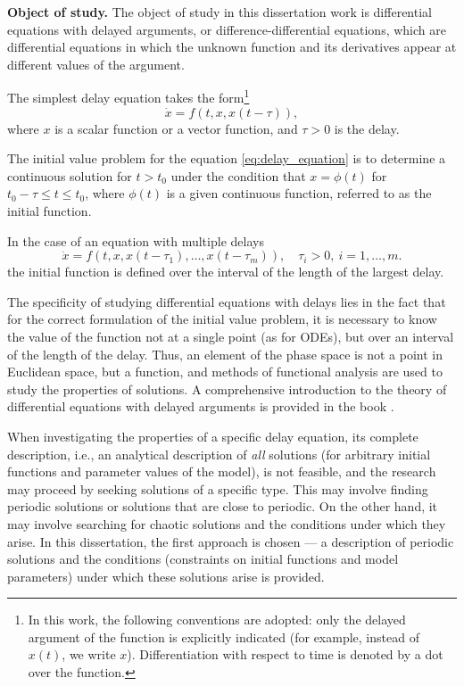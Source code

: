 \textbf{Object of study.} The object of study in this dissertation work is differential equations with delayed arguments, or difference-differential equations, which are differential equations in which the unknown function and its derivatives appear at different values of the argument.

The simplest delay equation takes the form\footnote{In this work, the following conventions are adopted: only the delayed argument of the function is explicitly indicated (for example, instead of $x(t)$, we write $x$). Differentiation with respect to time is denoted by a dot over the function.}
\begin{equation}
	\label{eq:delay_equation}
	\dot{x} = f(t, x, x(t - \tau)),
\end{equation}
where $x$ is a scalar function or a vector function, and $\tau > 0$ is the delay.

The initial value problem for the equation \eqref{eq:delay_equation} is to determine a continuous solution for $t > t_0$ under the condition that $x = \phi(t)$ for $t_0 - \tau \leq t \leq t_0$, where $\phi(t)$ is a given continuous function, referred to as the initial function.

In the case of an equation with multiple delays
\begin{equation}
	\label{eq:multiple_delay_equation}
	\dot{x} = f(t, x, x(t - \tau_1), \dots, x(t - \tau_m)), \quad \tau_i > 0, \ i = 1, \ldots, m.
\end{equation}
the initial function is defined over the interval of the length of the largest delay.

The specificity of studying differential equations with delays lies in the fact that for the correct formulation of the initial value problem, it is necessary to know the value of the function not at a single point (as for ODEs), but over an interval of the length of the delay. Thus, an element of the phase space is not a point in Euclidean space, but a function, and methods of functional analysis are used to study the properties of solutions. A comprehensive introduction to the theory of differential equations with delayed arguments is provided in the book \cite{Elsholtz1971}.

When investigating the properties of a specific delay equation, its complete description, i.e., an analytical description of \emph{all} solutions (for arbitrary initial functions and parameter values of the model), is not feasible, and the research may proceed by seeking solutions of a specific type. This may involve finding periodic solutions or solutions that are close to periodic. On the other hand, it may involve searching for chaotic solutions and the conditions under which they arise. In this dissertation, the first approach is chosen — a description of periodic solutions and the conditions (constraints on initial functions and model parameters) under which these solutions arise is provided.

